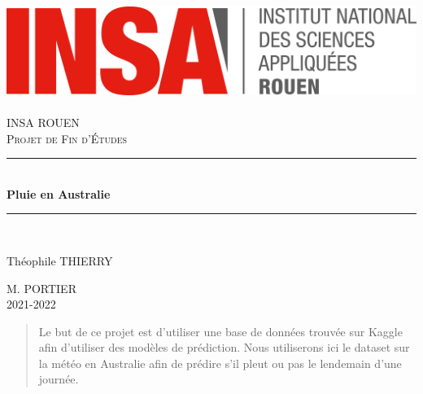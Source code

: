 \documentclass{article}
\begin{document}
\newcommand{\HRule}{\rule{\linewidth}{0.5mm}}

\begin{titlepage}
  \begin{sffamily}
  \begin{center}
    \hfill
    \includegraphics[scale=0.06]{./Images/logoINSARouen.png}~\\[1.5cm]

    \textsc{\LARGE INSA ROUEN}\\[1cm]

    \textsc{\Large Projet de Fin d'Études}\\[1cm]

    \HRule \\[0.4cm]
    { \huge \bfseries Pluie en Australie\\[0.4cm] }

    \HRule \\[1cm]

    \begin{minipage}{0.4\textwidth}
      \begin{flushleft} \large
        Théophile THIERRY\\
      \end{flushleft}
    \end{minipage}
    \begin{minipage}{0.4\textwidth}
      \begin{flushright} \large
        \textsc{M. PORTIER}\\
         2021-2022\\
      \end{flushright}
    \end{minipage}

    \vfill

  \end{center}
  \end{sffamily}
\end{titlepage}

\tableofcontents
\newpage

\begin{abstract}
Le but de ce projet est d'utiliser une base de données trouvée sur Kaggle afin d'utiliser des modèles de prédiction. Nous utiliserons ici le dataset sur la météo en Australie afin de prédire s'il pleut ou pas le lendemain d'une journée. 
\end{abstract}
\end{document}
